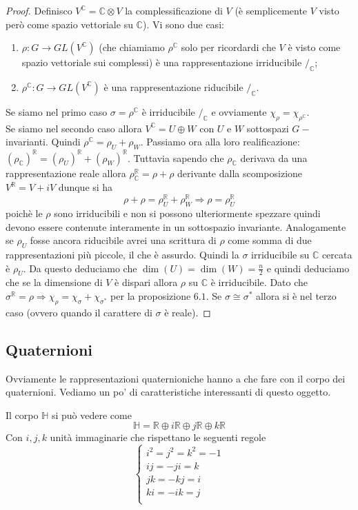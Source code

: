 \documentclass[11pt]{article}
\theoremstyle{plain}
\theoremstyle{definition}
\theoremstyle{remark}
\newcommand{\C}{\mathbb{C}}
\newcommand{\R}{\mathbb{R}}
\newcommand{\HH}{\mathbb{H}}
\begin{document}
\begin{proof} Definisco $V^\C=\C\otimes V$ la complessificazione di $V$ (è semplicemente $V$ visto però come spazio vettoriale su $\C$). Vi sono due casi:
\begin{enumerate}
\item $\rho:G\rightarrow GL(V^\C)$ (che chiamiamo $\rho^\C$ solo per ricordardi che $V$ è visto come spazio vettoriale sui complessi) è una rappresentazione irriducibile $/_\C$;
\item $\rho^\C:G\rightarrow GL(V^\C)$ è una rappresentazione riducibile $/_\C$.
\end{enumerate}
Se siamo nel primo caso $\sigma=\rho^\C$ è irriducibile $/_\C$ e ovviamente $\chi_\rho=\chi_{\rho^\C}$.\\ 
Se siamo nel secondo caso allora $V^\C=U\oplus W$ con $U$ e $W$ sottospazi $G-$invarianti. Quindi $\rho^\C=\rho_U+\rho_W$. Passiamo ora alla loro realificazione: $(\rho_\C)^\R=(\rho_U)^\R+(\rho_W)^\R$. Tuttavia sapendo che $\rho_\C$ derivava da una rappresentazione reale allora $\rho_\C^\R=\rho+\rho$ derivante dalla scomposizione $V^\R=V+iV$ dunque si ha
\[\rho+\rho=\rho_U^\R+\rho_W^\R\Rightarrow \rho=\rho_U^\R\]
 poichè le $\rho$ sono irriducibili e non si possono ulteriormente spezzare quindi devono essere contenute interamente in un sottospazio invariante. Analogamente se $\rho_U$ fosse ancora riducibile avrei una scrittura di $\rho$ come somma di due rappresentazioni più piccole, il che è assurdo. Quindi la $\sigma$ irriducibile su $\C$ cercata è $\rho_U$. Da questo deduciamo che $\dim(U)=\dim(W)=\frac{n}{2}$ e quindi deduciamo che se la dimensione di $V$ è dispari allora $\rho$ su $\C$ è irriducibile. Dato che $\sigma^\R=\rho\Rightarrow \chi_\rho=\chi_\sigma+\chi_{\sigma^*}$ per la proposizione $6.1$. Se $\sigma\cong \sigma^*$ allora si è nel terzo caso (ovvero quando il carattere di $\sigma$ è reale).

\end{proof}



\subsection{Quaternioni}
\label{sec:quaternioni}
Ovviamente le rappresentazioni quaternioniche hanno a che fare con il corpo dei quaternioni. Vediamo un po' di caratteristiche interessanti di questo oggetto.

Il corpo $\HH$ si può vedere come
\[\HH = \R \oplus i \R \oplus j \R \oplus k \R \]
Con $i,j,k$ unità immaginarie che rispettano le seguenti regole
\[ 
\begin{cases}
i^2 = j^2 = k^2 = -1 \\
ij = - ji = k \\
jk = -kj = i \\
ki = - ik = j \\
\end{cases}
\]
\end{document}
